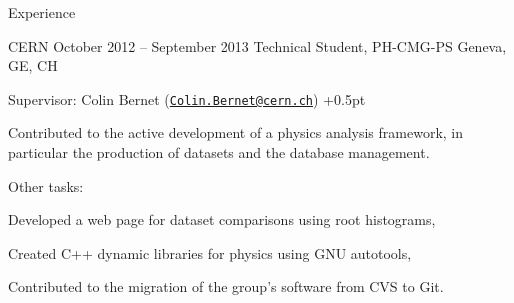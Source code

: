 \documentclass{resume}
\begin{document}
\begin{rSection}{Experience}

\begin{rSubsection}
  {CERN}
  {October 2012 -- September 2013}
  {Technical Student, PH-CMG-PS}
  {Geneva, GE, CH}
\item Supervisor: Colin Bernet
  (\href{mailto:Colin.Bernet@cern.ch}{\nolinkurl{Colin.Bernet@cern.ch}})
  \itemsep +0.5pt %
\item Contributed to the active development of a physics analysis framework,
  in particular the production of datasets and the database management.
\item Other tasks: \\
  \begin{inparaenum}[(i)]
  \item Developed a web page for dataset comparisons using root histograms, \\
  \item Created C++ dynamic libraries for physics using GNU autotools, \\
  \item Contributed to the migration of the group's software from CVS to Git.
  \end{inparaenum}
\end{rSubsection}




\end{rSection}
\end{document}
